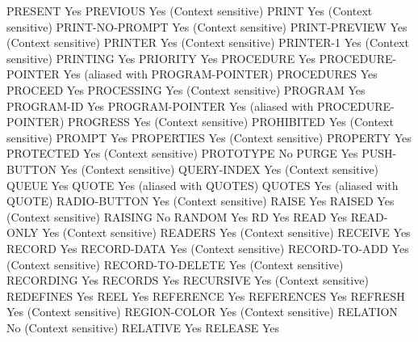 PRESENT                         Yes
PREVIOUS                        Yes (Context sensitive)
PRINT                           Yes (Context sensitive)
PRINT-NO-PROMPT                 Yes (Context sensitive)
PRINT-PREVIEW                   Yes (Context sensitive)
PRINTER                         Yes (Context sensitive)
PRINTER-1                       Yes (Context sensitive)
PRINTING                        Yes
PRIORITY                        Yes
PROCEDURE                       Yes
PROCEDURE-POINTER               Yes (aliased with PROGRAM-POINTER)
PROCEDURES                      Yes
PROCEED                         Yes
PROCESSING                      Yes (Context sensitive)
PROGRAM                         Yes
PROGRAM-ID                      Yes
PROGRAM-POINTER                 Yes (aliased with PROCEDURE-POINTER)
PROGRESS                        Yes (Context sensitive)
PROHIBITED                      Yes (Context sensitive)
PROMPT                          Yes
PROPERTIES                      Yes (Context sensitive)
PROPERTY                        Yes
PROTECTED                       Yes (Context sensitive)
PROTOTYPE                       No
PURGE                           Yes
PUSH-BUTTON                     Yes (Context sensitive)
QUERY-INDEX                     Yes (Context sensitive)
QUEUE                           Yes
QUOTE                           Yes (aliased with QUOTES)
QUOTES                          Yes (aliased with QUOTE)
RADIO-BUTTON                    Yes (Context sensitive)
RAISE                           Yes
RAISED                          Yes (Context sensitive)
RAISING                         No
RANDOM                          Yes
RD                              Yes
READ                            Yes
READ-ONLY                       Yes (Context sensitive)
READERS                         Yes (Context sensitive)
RECEIVE                         Yes
RECORD                          Yes
RECORD-DATA                     Yes (Context sensitive)
RECORD-TO-ADD                   Yes (Context sensitive)
RECORD-TO-DELETE                Yes (Context sensitive)
RECORDING                       Yes
RECORDS                         Yes
RECURSIVE                       Yes (Context sensitive)
REDEFINES                       Yes
REEL                            Yes
REFERENCE                       Yes
REFERENCES                      Yes
REFRESH                         Yes (Context sensitive)
REGION-COLOR                    Yes (Context sensitive)
RELATION                        No (Context sensitive)
RELATIVE                        Yes
RELEASE                         Yes
